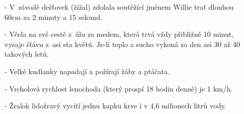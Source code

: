 \begin{multicols}{2}
\begin{itemize}
\item[-] V~závodě dešťovek (žížal) zdolala soutěžící jménem Willie 
trať dlouhou 60cm za 2 minuty a 15 sekund.

\item[-] Včela na své cestě z~úlu za medem, která trvá vždy přibližně 
10 minut, vysaje šťávu z~asi sta květů. Je-li teplo a sucho 
vykoná za den asi 30 až 40 takových letů.

\item[-] Velké kudlanky napadají a požírají žáby a ptáčata.

\item[-] Vrcholová rychlost lenochoda (který prospí 18 hodin denně) je 
1 km/h.

\item[-] Žralok lidožravý vycítí jednu kapku krve i v 4,6 milionech litrů 
vody.

\end{itemize}

\end{multicols}
\clearpage

